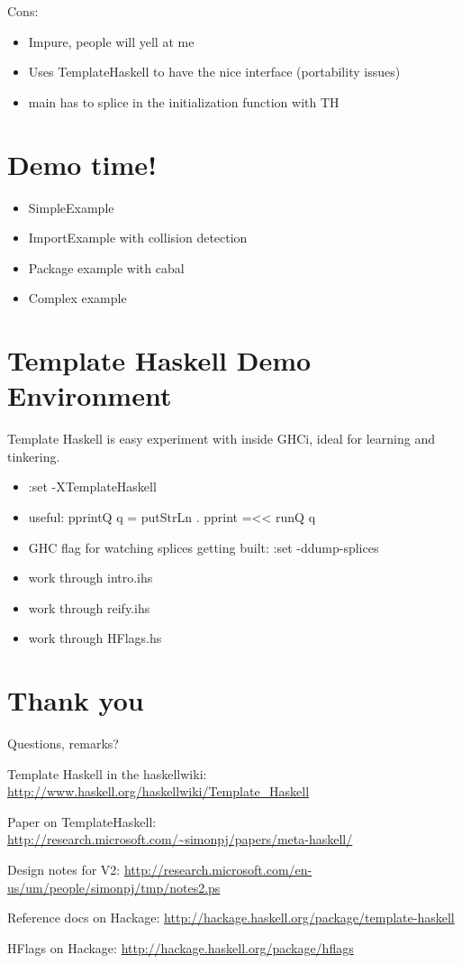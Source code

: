 \documentclass[]{article}
\begin{document}
Cons:

\begin{itemize}
\item
  Impure, people will yell at me
\item
  Uses TemplateHaskell to have the nice interface (portability issues)
\item
  main has to splice in the initialization function with TH
\end{itemize}

\section{Demo time!}

\begin{itemize}
\item
  SimpleExample
\item
  ImportExample with collision detection
\item
  Package example with cabal
\item
  Complex example
\end{itemize}

\section{Template Haskell Demo Environment}

Template Haskell is easy experiment with inside GHCi, ideal for learning
and tinkering.

\begin{itemize}
\item
  :set -XTemplateHaskell
\item
  useful: pprintQ q = putStrLn . pprint =\textless{}\textless{} runQ q
\item
  GHC flag for watching splices getting built: :set -ddump-splices
\item
  work through intro.ihs
\item
  work through reify.ihs
\item
  work through HFlags.hs
\end{itemize}

\section{Thank you}

Questions, remarks?

Template Haskell in the haskellwiki:
\url{http://www.haskell.org/haskellwiki/Template_Haskell}

Paper on TemplateHaskell:
\url{http://research.microsoft.com/~simonpj/papers/meta-haskell/}

Design notes for V2:
\url{http://research.microsoft.com/en-us/um/people/simonpj/tmp/notes2.ps}

Reference docs on Hackage:
\url{http://hackage.haskell.org/package/template-haskell}

HFlags on Hackage: \url{http://hackage.haskell.org/package/hflags}
\end{document}
